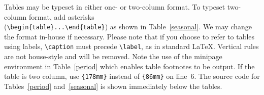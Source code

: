 \documentclass[twocolumn]{igs}
\begin{document}
Tables may be typeset in either one- or two-column format. To typeset two-column format, add asterisks\\
(\verb"\begin{table}...\end{table}") as shown in Table~\ref{seasonal}. We may change the format in-house if necessary. Please note that if you choose to refer to tables using labels, \verb"\caption" must precede \verb"\label", as in standard \LaTeX. Vertical rules are not house-style and will be removed. Note the use of the minipage environment in Table~\ref{period} which enables table footnotes to be output. If the table is two column, use \texttt{\{178mm\}} instead of \texttt{\{86mm\}} on line~6. The source code for Tables~\ref{period} and~\ref{seasonal} is shown immediately below the tables.
\end{document}
